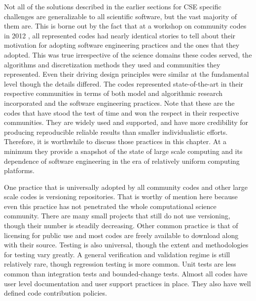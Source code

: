 \label{sec:generalization}

Not all of the solutions described in the earlier sections for CSE
specific challenges are generalizable to all scientific software, but
the vast majority of them are. This is borne out by the fact that at a
workshop on community codes in 2012 \cite{}, all represented codes
had nearly identical stories to tell about their motivation for
adopting software engineering practices and the ones that they
adopted. This was true irrespective of the science domains these codes
served, the algorithms and discretization methods they used and
communities they represented. Even their driving design principles
were similar at the fundamental level though the details differed. The
codes represented state-of-the-art in their respective communities in
terms of both model and algorithmic research incorporated and the
software engineering practices. Note that these are the codes that
have stood the test of time and won the respect in their respective
communities. They are widely used and supported, and have more
credibility for producing reproducible reliable results than smaller
individualistic efforts. Therefore, it is worthwhile to discuss
those practices in this chapter. At a minimum they provide a snapshot
of the state of large scale computing and its dependence of software
engineering in the era of relatively uniform computing platforms. 

One practice that is universally adopted by all community codes and
other large scale codes is versioning repositories. That is worthy of
mention here because even this practice has not penetrated the whole
computational science community. There are many small projects
that still do not use versioning, though their number is steadily
decreasing. Other common practice is that of licensing for public use
and most codes are freely available to download along with their
source. Testing is also universal, though the extent and methodologies
for testing vary greatly. A general verification and validation regime
is still relatively rare, though regression testing is more
common. Unit tests are less common than integration tests and
bounded-change tests. Almost all codes have user level documentation
and user support practices in place. They also have well defined code
contribution policies. 

